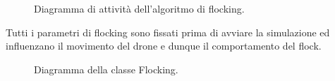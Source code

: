 \begin{figure}[H] 
    \captionsetup{justification=centering, margin=2cm, font=footnotesize}
    \begin{center}
    \end{center}
    \caption[short]{Diagramma di attività dell'algoritmo di flocking.}
    \label{activity_flocking}
\end{figure}

Tutti i parametri di flocking sono fissati prima di avviare la simulazione ed influenzano il movimento del drone e dunque il comportamento del flock.

\begin{figure}[H] 
    \captionsetup{justification=centering, margin=2cm, font=footnotesize}
    \begin{center}
    \end{center}
    \caption[short]{Diagramma della classe Flocking.}
    \label{classe_flocking}
\end{figure}


